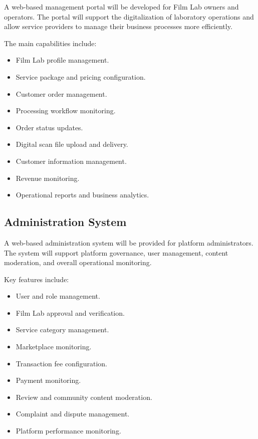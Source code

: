 A web-based management portal will be developed for Film Lab owners and operators. The portal will support the digitalization of laboratory operations and allow service providers to manage their business processes more efficiently.

The main capabilities include:

\begin{itemize}
    \item Film Lab profile management.
    \item Service package and pricing configuration.
    \item Customer order management.
    \item Processing workflow monitoring.
    \item Order status updates.
    \item Digital scan file upload and delivery.
    \item Customer information management.
    \item Revenue monitoring.
    \item Operational reports and business analytics.
\end{itemize}

\subsection{Administration System}

A web-based administration system will be provided for platform administrators. The system will support platform governance, user management, content moderation, and overall operational monitoring.

Key features include:

\begin{itemize}
    \item User and role management.
    \item Film Lab approval and verification.
    \item Service category management.
    \item Marketplace monitoring.
    \item Transaction fee configuration.
    \item Payment monitoring.
    \item Review and community content moderation.
    \item Complaint and dispute management.
    \item Platform performance monitoring.
\end{itemize}


